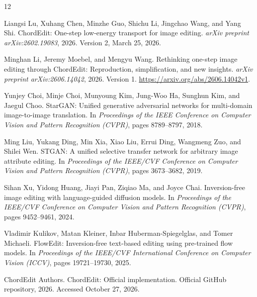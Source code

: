 \documentclass[11pt,a4paper]{article}
\begin{document}
\begin{thebibliography}{12}

Liangsi Lu, Xuhang Chen, Minzhe Guo, Shichu Li, Jingchao Wang, and Yang Shi.
\newblock ChordEdit: One-step low-energy transport for image editing.
\newblock \emph{arXiv preprint arXiv:2602.19083}, 2026. Version 2, March 25, 2026.

Minghan Li, Jeremy Moebel, and Mengyu Wang.
\newblock Rethinking one-step image editing through ChordEdit: Reproduction, simplification, and new insights.
\newblock \emph{arXiv preprint arXiv:2606.14042}, 2026. Version 1. \url{https://arxiv.org/abs/2606.14042v1}.

Yunjey Choi, Minje Choi, Munyoung Kim, Jung-Woo Ha, Sunghun Kim, and Jaegul Choo.
\newblock StarGAN: Unified generative adversarial networks for multi-domain image-to-image translation.
\newblock In \emph{Proceedings of the IEEE Conference on Computer Vision and Pattern Recognition (CVPR)}, pages 8789--8797, 2018.

Ming Liu, Yukang Ding, Min Xia, Xiao Liu, Errui Ding, Wangmeng Zuo, and Shilei Wen.
\newblock STGAN: A unified selective transfer network for arbitrary image attribute editing.
\newblock In \emph{Proceedings of the IEEE/CVF Conference on Computer Vision and Pattern Recognition (CVPR)}, pages 3673--3682, 2019.

Sihan Xu, Yidong Huang, Jiayi Pan, Ziqiao Ma, and Joyce Chai.
\newblock Inversion-free image editing with language-guided diffusion models.
\newblock In \emph{Proceedings of the IEEE/CVF Conference on Computer Vision and Pattern Recognition (CVPR)}, pages 9452--9461, 2024.

Vladimir Kulikov, Matan Kleiner, Inbar Huberman-Spiegelglas, and Tomer Michaeli.
\newblock FlowEdit: Inversion-free text-based editing using pre-trained flow models.
\newblock In \emph{Proceedings of the IEEE/CVF International Conference on Computer Vision (ICCV)}, pages 19721--19730, 2025.

ChordEdit Authors.
\newblock ChordEdit: Official implementation.
\newblock Official GitHub repository, 2026. Accessed October 27, 2026.


\end{thebibliography}
\end{document}
